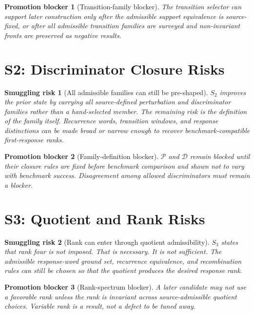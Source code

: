 \documentclass[11pt]{article}
\newtheorem{smugglingrisk}{Smuggling risk}
\newtheorem{promotionblocker}{Promotion blocker}
\begin{document}
\begin{promotionblocker}[Transition-family blocker]
The transition selector can support later construction only after the
admissible support equivalence is source-fixed, or after all admissible
transition families are surveyed and non-invariant fronts are preserved as
negative results.
\end{promotionblocker}

\section{S2: Discriminator Closure Risks}

\begin{smugglingrisk}[All admissible families can still be pre-shaped]
\(S_2\) improves the prior state by carrying all source-defined perturbation
and discriminator families rather than a hand-selected member. The remaining
risk is the definition of the family itself. Recurrence words, transition
windows, and response distinctions can be made broad or narrow enough to
recover benchmark-compatible first-response ranks.
\end{smugglingrisk}

\begin{promotionblocker}[Family-definition blocker]
\(\mathcal{P}\) and \(\mathcal{D}\) remain blocked until their closure rules
are fixed before benchmark comparison and shown not to vary with benchmark
success. Disagreement among allowed discriminators must remain a blocker.
\end{promotionblocker}

\section{S3: Quotient and Rank Risks}

\begin{smugglingrisk}[Rank can enter through quotient admissibility]
\(S_3\) states that rank four is not imposed. That is necessary. It is not
sufficient. The admissible response-word ground set, recurrence equivalence,
and recombination rules can still be chosen so that the quotient produces the
desired response rank.
\end{smugglingrisk}

\begin{promotionblocker}[Rank-spectrum blocker]
A later candidate may not use a favorable rank unless the rank is invariant
across source-admissible quotient choices. Variable rank is a result, not a
defect to be tuned away.
\end{promotionblocker}
\end{document}
